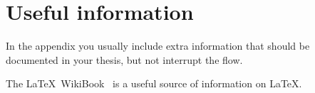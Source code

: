 \chapter{Useful information}
\label{sec:app}

In the appendix you usually include extra information that should be
documented in your thesis, but not interrupt the flow.

The \LaTeX\ WikiBook~\cite{latexwiki} is a useful source of information on \LaTeX.

